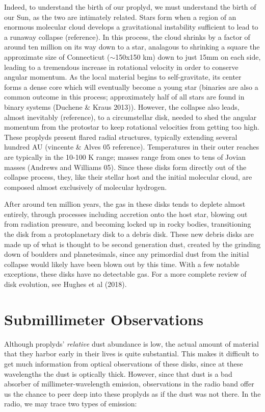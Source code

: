 Indeed, to understand the birth of our proplyd, we must understand the birth of our Sun, as the two are intimately related. Stars form when a region of an enormous molecular cloud develops a gravitational instability sufficient to lead to a runaway collapse (reference). In this process, the cloud shrinks by a factor of around ten million on its way down to a star, analagous to shrinking a square the approximate size of Connecticut ($\sim$150x150 km) down to just 15mm on each side, leading to a tremendous increase in rotational velocity in order to conserve angular momentum. As the local material begins to self-gravitate, its center forms a dense core which will eventually become a young star (binaries are also a common outcome in this process; approximately half of all stars are found in binary systems (Duchene & Kraus 2013)). However, the collapse also leads, almost inevitably (reference), to a circumstellar disk, needed to shed the angular momentum from the protostar to keep rotational velocities from getting too high. These proplyds present flared radial structures, typically extending several hundred AU (vincente & Alves 05 reference). Temperatures in their outer reaches are typically in the 10-100 K range; masses range from ones to tens of Jovian masses (Andrews and Williams 05). Since these disks form directly out of the collapse process, they, like their stellar host and the initial molecular cloud, are composed almost exclusively of molecular hydrogen.

After around ten million years, the gas in these disks tends to deplete almost entirely, through processes including accretion onto the host star, blowing out from radiation pressure, and becoming locked up in rocky bodies, transitioning the disk from a protoplanetary disk to a debris disk. These new debris disks are made up of what is thought to be second generation dust, created by the grinding down of boulders and planetesimals, since any primordial dust from the initial collapse would likely have been blown out by this time. With a few notable exceptions, these disks have no detectable gas. For a more complete review of disk evolution, see Hughes et al (2018).





\section{Submillimeter Observations}

Although proplyds' \textit{relative} dust abundance is low, the actual amount of material that they harbor early in their lives is quite substantial. This makes it difficult to get much information from optical observations of these disks, since at these wavelengths the dust is optically thick. However, since that dust is a bad absorber of millimeter-wavelength emission, observations in the radio band offer us the chance to peer deep into these proplyds as if the dust was not there. In the radio, we may trace two types of emission:

